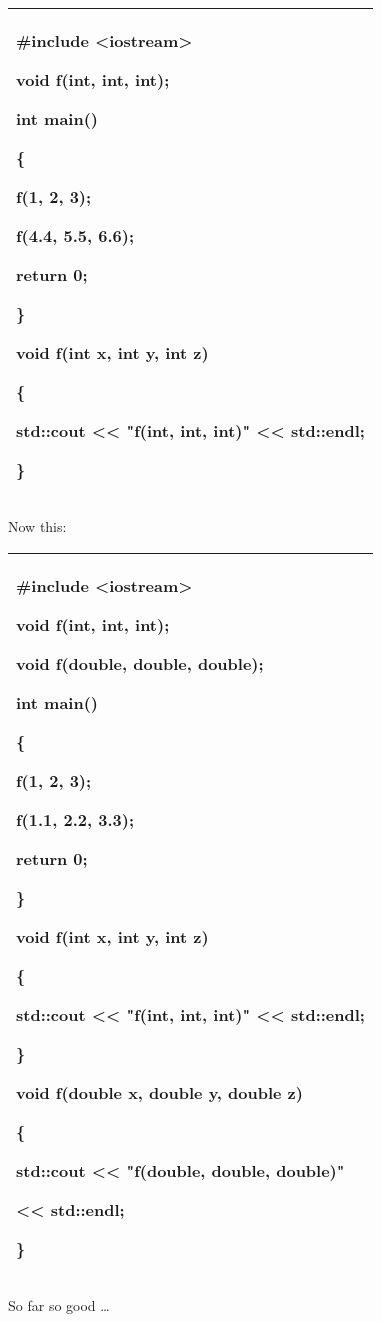 \documentclass[
]{article}
\begin{document}
\begin{longtable}[]{@{}l@{}}
\toprule
\endhead
\begin{minipage}[t]{0.97\columnwidth}\raggedright
\#include \textless iostream\textgreater{}

void f(int, int, int);

int main()

\{

f(1, 2, 3);

f(4.4, 5.5, 6.6);

return 0;

\}

void f(int x, int y, int z)

\{

std::cout \textless\textless{} "f(int, int, int)" \textless\textless{}
std::endl;

\}\strut
\end{minipage}\tabularnewline
\bottomrule
\end{longtable}

Now this:

\begin{longtable}[]{@{}l@{}}
\toprule
\endhead
\begin{minipage}[t]{0.97\columnwidth}\raggedright
\#include \textless iostream\textgreater{}

void f(int, int, int);

void f(double, double, double);

int main()

\{

f(1, 2, 3);

f(1.1, 2.2, 3.3);

return 0;

\}

void f(int x, int y, int z)

\{

std::cout \textless\textless{} "f(int, int, int)" \textless\textless{}
std::endl;

\}

void f(double x, double y, double z)

\{

std::cout \textless\textless{} "f(double, double, double)"

\textless\textless{} std::endl;

\}\strut
\end{minipage}\tabularnewline
\bottomrule
\end{longtable}

So far so good \ldots{}
\end{document}
